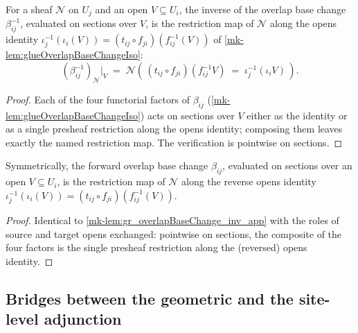\begin{lemma}\label{mk-lem:gr_overlapBaseChange_inv_app}
  \leanok

  For a sheaf \(\mathcal{N}\) on \(U_j\) and an open \(V \subseteq U_i\), the inverse
  of the overlap base change \(\beta_{ij}^{-1}\), evaluated on sections over \(V\), is
  the restriction map of \(\mathcal{N}\) along the opens identity
  \(\iota_j^{-1}(\iota_i(V)) = (t_{ij}\circ f_{ji})(f_{ij}^{-1}(V))\) of
  \ref{mk-lem:glueOverlapBaseChangeIso}:
  \[
    (\beta_{ij}^{-1})_{\mathcal{N}}\big|_V
      \;=\;
    \mathcal{N}\!\left(\,(t_{ij}\circ f_{ji})(f_{ij}^{-1}V) \;=\; \iota_j^{-1}(\iota_i V)\,\right).
  \]
\end{lemma}
\begin{proof}
  \leanok
  Each of the four functorial factors of \(\beta_{ij}\) (\ref{mk-lem:glueOverlapBaseChangeIso})
  acts on sections over \(V\) either as the identity or as a single presheaf
  restriction along the opens identity; composing them leaves exactly the named
  restriction map. The verification is pointwise on sections.
\end{proof}

\begin{lemma}\label{mk-lem:gr_overlapBaseChange_hom_app}
  \leanok

  Symmetrically, the forward overlap base change \(\beta_{ij}\), evaluated on sections
  over an open \(V \subseteq U_i\), is the restriction map of \(\mathcal{N}\) along the
  reverse opens identity \(\iota_j^{-1}(\iota_i(V)) = (t_{ij}\circ f_{ji})(f_{ij}^{-1}(V))\).
\end{lemma}
\begin{proof}
  \leanok
  Identical to \ref{mk-lem:gr_overlapBaseChange_inv_app} with the roles of source and
  target opens exchanged: pointwise on sections, the composite of the four factors is
  the single presheaf restriction along the (reversed) opens identity.
\end{proof}

\subsection{Bridges between the geometric and the site-level adjunction}

